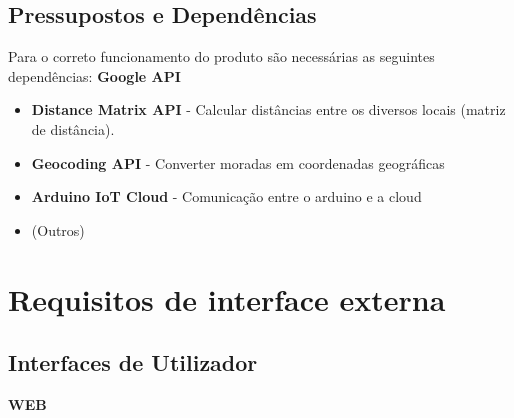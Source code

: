 \documentclass{scrreprt}
\begin{document}
	\section{Pressupostos e Dependências}
	Para o correto funcionamento do produto são necessárias as seguintes dependências:
	\textbf{\large Google API}
	\begin{itemize}
		\item \textbf{Distance Matrix API} - Calcular distâncias entre os diversos locais (matriz de distância).
		\item \textbf{Geocoding API} - Converter moradas em coordenadas geográficas
		\item \textbf{Arduino IoT Cloud} - Comunicação entre o arduino e a cloud
		\item (Outros)
	\end{itemize}
	
	{\let\clearpage\relax \chapter{Requisitos de interface externa}}
	
	\section{Interfaces de Utilizador}
	
	\begin{Large}
		\begin{center}
			\textbf{WEB}
		\end{center}
	\end{Large}
\end{document}
